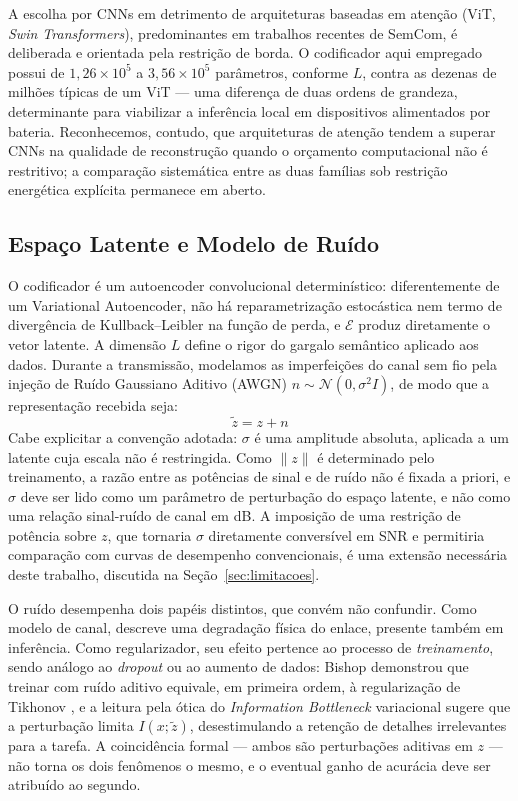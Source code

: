 \documentclass[conference]{IEEEtran}
\begin{document}
A escolha por CNNs em detrimento de arquiteturas baseadas em atenção (ViT, \textit{Swin Transformers}), predominantes em trabalhos recentes de SemCom, é deliberada e orientada pela restrição de borda. O codificador aqui empregado possui de $1{,}26 \times 10^5$ a $3{,}56 \times 10^5$ parâmetros, conforme $L$, contra as dezenas de milhões típicas de um ViT --- uma diferença de duas ordens de grandeza, determinante para viabilizar a inferência local em dispositivos alimentados por bateria. Reconhecemos, contudo, que arquiteturas de atenção tendem a superar CNNs na qualidade de reconstrução quando o orçamento computacional não é restritivo; a comparação sistemática entre as duas famílias sob restrição energética explícita permanece em aberto.

\subsection{Espaço Latente e Modelo de Ruído}
O codificador é um autoencoder convolucional determinístico: diferentemente de um Variational Autoencoder, não há reparametrização estocástica nem termo de divergência de Kullback--Leibler na função de perda, e $\mathcal{E}$ produz diretamente o vetor latente. A dimensão $L$ define o rigor do gargalo semântico aplicado aos dados. Durante a transmissão, modelamos as imperfeições do canal sem fio pela injeção de Ruído Gaussiano Aditivo (AWGN) $n \sim \mathcal{N}(0, \sigma^2 I)$, de modo que a representação recebida seja:
\begin{equation}
    \tilde{z} = z + n
\end{equation}
Cabe explicitar a convenção adotada: $\sigma$ é uma amplitude absoluta, aplicada a um latente cuja escala não é restringida. Como $\|z\|$ é determinado pelo treinamento, a razão entre as potências de sinal e de ruído não é fixada a priori, e $\sigma$ deve ser lido como um parâmetro de perturbação do espaço latente, e não como uma relação sinal-ruído de canal em dB. A imposição de uma restrição de potência sobre $z$, que tornaria $\sigma$ diretamente conversível em SNR e permitiria comparação com curvas de desempenho convencionais, é uma extensão necessária deste trabalho, discutida na Seção~\ref{sec:limitacoes}.

O ruído desempenha dois papéis distintos, que convém não confundir. Como modelo de canal, descreve uma degradação física do enlace, presente também em inferência. Como regularizador, seu efeito pertence ao processo de \textit{treinamento}, sendo análogo ao \textit{dropout} ou ao aumento de dados: Bishop demonstrou que treinar com ruído aditivo equivale, em primeira ordem, à regularização de Tikhonov \cite{bishop1995noise}, e a leitura pela ótica do \textit{Information Bottleneck} variacional \cite{alemi2017vib, tishby2015ib} sugere que a perturbação limita $I(x; \tilde{z})$, desestimulando a retenção de detalhes irrelevantes para a tarefa. A coincidência formal --- ambos são perturbações aditivas em $z$ --- não torna os dois fenômenos o mesmo, e o eventual ganho de acurácia deve ser atribuído ao segundo.
\end{document}
